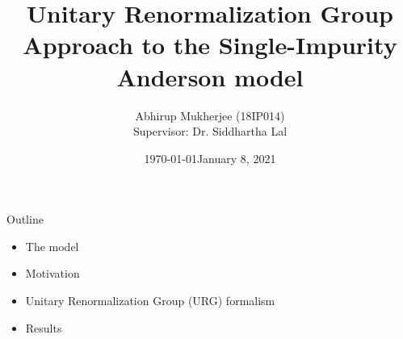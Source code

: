 \documentclass[aspectratio=169]{beamer}
\title{Unitary Renormalization Group Approach to the Single-Impurity Anderson model}
\subtitle{}
\date{\today}
\author{Abhirup Mukherjee (18IP014)\\[5mm]{Supervisor: Dr. Siddhartha Lal}}
\institute{IISER Kolkata}
\date{January 8, 2021}
\begin{document}
\begin{frame}
\maketitle
\end{frame}

\begin{frame}{Outline}

\begin{itemize}
  \item The model
	  \vspace*{20pt}
  \item Motivation
	  \vspace*{20pt}
  \item Unitary Renormalization Group (URG) formalism
	  \vspace*{20pt}
  \item Results 
\end{itemize}

\end{frame}
\end{document}
